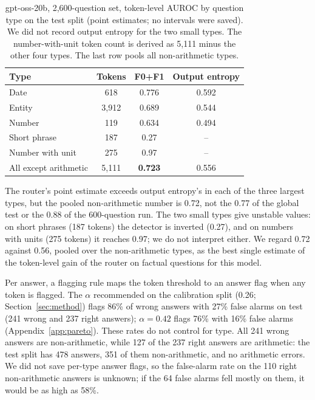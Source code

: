 \documentclass[11pt]{article}
\newcommand{\FZO}{\textsf{F0+F1}}
\begin{document}
\begin{table}[t]
\centering
\small
\caption{gpt-oss-20b, 2,600-question set, token-level AUROC by question type on the test split (point estimates; no intervals were saved). We did not record output entropy for the two small types. The number-with-unit token count is derived as 5,111 minus the other four types. The last row pools all non-arithmetic types.}
\label{tab:v2type}
\begin{tabular}{lccc}
\toprule
Type & Tokens & \FZO{} & Output entropy \\
\midrule
Date & 618 & 0.776 & 0.592 \\
Entity & 3,912 & 0.689 & 0.544 \\
Number & 119 & 0.634 & 0.494 \\
Short phrase & 187 & 0.27 & -- \\
Number with unit & 275 & 0.97 & -- \\
All except arithmetic & 5,111 & \textbf{0.723} & 0.556 \\
\bottomrule
\end{tabular}
\end{table}

The router's point estimate exceeds output entropy's in each of the three largest types, but the pooled non-arithmetic number is 0.72, not the 0.77 of the global test or the 0.88 of the 600-question run.
The two small types give unstable values: on short phrases (187 tokens) the detector is inverted (0.27), and on numbers with units (275 tokens) it reaches 0.97; we do not interpret either.
We regard 0.72 against 0.56, pooled over the non-arithmetic types, as the best single estimate of the token-level gain of the router on factual questions for this model.

Per answer, a flagging rule maps the token threshold to an answer flag when any token is flagged.
The $\alpha$ recommended on the calibration split (0.26; Section~\ref{sec:method}) flags 86\% of wrong answers with 27\% false alarms on test (241 wrong and 237 right answers); $\alpha=0.42$ flags 76\% with 16\% false alarms (Appendix~\ref{app:pareto}).
These rates do not control for type.
All 241 wrong answers are non-arithmetic, while 127 of the 237 right answers are arithmetic: the test split has 478 answers, 351 of them non-arithmetic, and no arithmetic errors.
We did not save per-type answer flags, so the false-alarm rate on the 110 right non-arithmetic answers is unknown; if the 64 false alarms fell mostly on them, it would be as high as 58\%.
\end{document}
